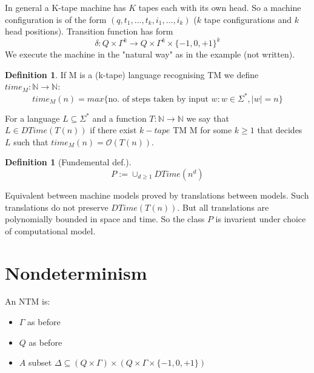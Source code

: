 \documentclass[a4paper,12pt]{article}
\theoremstyle{definition}
\newtheorem{definition}[counter]{Definition}
\theoremstyle{remark}
\newcommand{\N}{\mathbb{N}}
\begin{document}
In general a K-tape machine has $K$ tapes each with its own head. So a machine configuration is of the form 
$(q, t_1, \dots, t_k, i_1, \dots, i_k)$ ($k$ tape configurations and $k$ head positions).
Transition function has form
\begin{equation*}
    \delta: Q \times \Gamma^k \to Q \times \Gamma^k \times \{-1, 0, +1\}^k
\end{equation*}
We execute the machine in the "natural way" as in the example (not written).

\begin{definition}
    If M is a (k-tape) language recognising TM we define $time_M: \N \to \N$:
    \begin{equation*}
        time_M(n) = max \{\text{no. of steps taken by input }w: w \in \Sigma^*,  |w| = n\}
    \end{equation*}

    For a language $L \subseteq \Sigma^*$ and a function $T: \N \to \N$ we say that $L \in DTime(T(n))$ if there exist $k-tape$ TM M for
    some $k \geq 1$ that decides $L$ such that $time_M(n) = \mathscr{O}(T(n))$.
\end{definition}

\begin{definition}[Fundemental def.]
    \begin{equation*}
        P := \cup_{d \geq 1} DTime(n^d)
    \end{equation*}
\end{definition}

Equivalent between machine models proved by translations between models. Such translations do not preserve $DTime(T(n))$. But 
all translations are polynomially bounded in space and time. So the class $P$ is invarient under choice of computational model.






\newpage
\section{Nondeterminism}
An NTM is:
\begin{itemize}
    \item $\Gamma$ as before
    \item $Q$ as before
    \item $A$ subset $\Delta \subseteq (Q \times \Gamma) \times (Q \times \Gamma \times \{-1, 0, +1\})$
\end{itemize}
\end{document}
